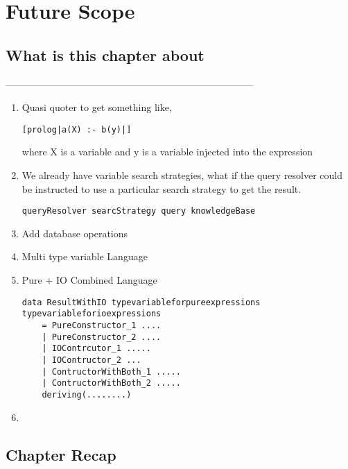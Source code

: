 \documentclass[thesis-solanki.tex]{subfiles}
\begin{document}
\chapter{Future Scope}\label{chap:futureScope}


\section{What is this chapter about}

-----------------------------------------------------------------------------


\begin{enumerate}

\item Quasi quoter to get something like,
\begin{verbatim}
[prolog|a(X) :- b(y)|]
\end{verbatim}
where X is a   variable and y is a  variable injected into the expression


\item We already have variable search strategies, what if the query resolver could be instructed to use a particular search strategy to get 
the result.
\begin{verbatim}
queryResolver searcStrategy query knowledgeBase
\end{verbatim}


\item Add database operations

\item Multi type variable Language

\item Pure + IO Combined Language

\begin{verbatim}
data ResultWithIO typevariableforpureexpressions typevariableforioexpressions
	= PureConstructor_1 ....
	| PureConstructor_2 ....
	| IOContrcutor_1 .....
	| IOContructor_2 ...
	| ContructorWithBoth_1 .....
	| ContructorWithBoth_2 .....
	deriving(........)
\end{verbatim}

\item 

\end{enumerate}


\section{Chapter Recap}
\end{document}
